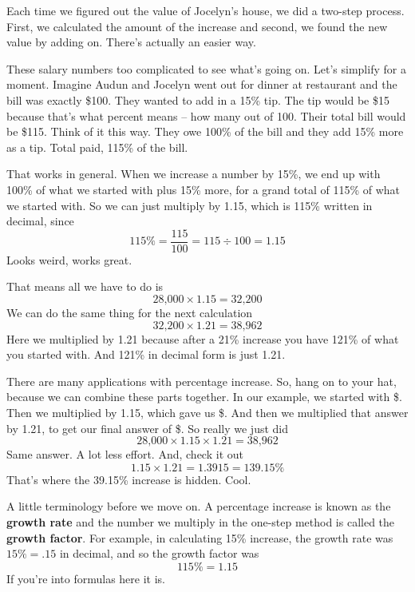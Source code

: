 Each time we figured out the value of Jocelyn's house, we did a two-step process.  First, we calculated the amount of the increase and second, we found the new value by adding on.  There's actually an easier way.

These salary numbers too complicated to see what's going on.  Let's simplify for a moment.  Imagine Audun and Jocelyn went out for dinner at restaurant and the bill was exactly \$100.  They wanted to add in a 15\% tip.  The tip would be \$15 because that's what percent means -- how many out of 100.  Their total bill would be \$115.  Think of it this way.  They owe 100\% of the bill and they add 15\% more as a tip.  Total paid, 115\% of the bill.  

That works in general.  When we increase a number by 15\%, we end up with 100\% of what we started with plus 15\% more, for a grand total of 115\% of what we started with. So we can just multiply by 1.15, which is 115\% written in decimal, since $$115\% = \frac{115}{100} = 115 \div 100 = 1.15$$ Looks weird, works great.    

That means all we have to do is $$\text{28,000} \times 1.15 = \text{32,200}$$  We can do the same thing for the next calculation $$\text{32,200} \times 1.21 = \text{38,962}$$  
Here we multiplied by 1.21 because after a 21\% increase you have 121\% of what you started with.  And 121\% in decimal form is just 1.21. 

There are many applications with percentage increase.  So, hang on to your hat, because we can combine these parts together.  In our example, we started with \$.  Then we multiplied by 1.15, which gave us \$.  And then we multiplied that answer by 1.21, to get our final answer of \$.  So really we just did 
$$\text{28,000} \times 1.15 \times 1.21 = \text{38,962}$$  Same answer.  A lot less effort.
And, check it out $$1.15 \times 1.21 = 1.3915 =139.15\%$$ That's where the 39.15\% increase is hidden. Cool.

A little terminology before we move on.  A percentage increase is known as the \textbf{growth rate} and the number we multiply in the one-step method is called the \textbf{growth factor}.  For example, in calculating 15\% increase, the growth rate was $15\%=.15$ in decimal, and so the growth factor was $$115\%=1.15$$  If you're into formulas here it is. 

 \bigskip
  

